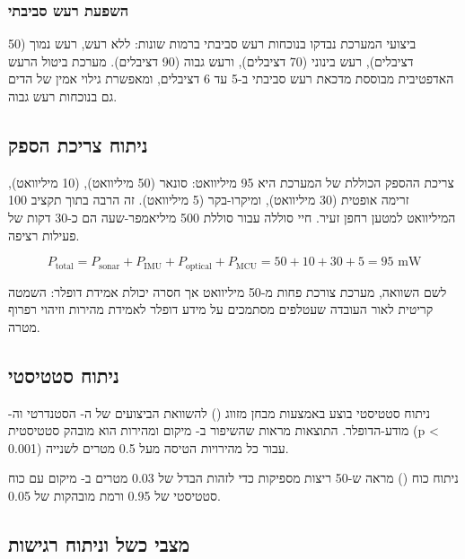 \subsubsection{השפעת רעש סביבתי}
\label{sec:ch08_noise_effect}

ביצועי המערכת נבדקו בנוכחות רעש סביבתי ברמות שונות: ללא רעש, רעש נמוך (50 דציבלים), רעש בינוני (70 דציבלים), ורעש גבוה (90 דציבלים). מערכת ביטול הרעש האדפטיבית מבוססת  מדכאת רעש סביבתי ב-5 עד 6 דציבלים, ומאפשרת גילוי אמין של הדים גם בנוכחות רעש גבוה.

\subsection{ניתוח צריכת הספק}
\label{sec:ch08_power_analysis}

צריכת ההספק הכוללת של המערכת היא 95 מיליוואט: סונאר (50 מיליוואט),  (10 מיליוואט), זרימה אופטית (30 מיליוואט), ומיקרו-בקר (5 מיליוואט). זה הרבה בתוך תקציב 100 המיליוואט למטען רחפן זעיר. חיי סוללה עבור סוללת  500 מיליאמפר-שעה הם כ-30 דקות של פעילות רציפה.

\begin{equation}
P_{\text{total}} = P_{\text{sonar}} + P_{\text{IMU}} + P_{\text{optical}} + P_{\text{MCU}} = 50 + 10 + 30 + 5 = 95 \text{ mW}
\label{eq:ch08_power_total}
\end{equation}

לשם השוואה, מערכת  \cite{Chen2020BioSonar} צורכת פחות מ-50 מיליוואט אך חסרה יכולת אמידת דופלר: השמטה קריטית לאור העובדה שעטלפים מסתמכים על מידע דופלר לאמידת מהירות וזיהוי רפרוף מטרה.

\subsection{ניתוח סטטיסטי}
\label{sec:ch08_statistical_analysis}

ניתוח סטטיסטי בוצע באמצעות מבחן  מזווג () להשוואת הביצועים של ה- הסטנדרטי וה- מודע-הדופלר. התוצאות מראות שהשיפור ב- מיקום ומהירות הוא מובהק סטטיסטית (p < 0.001) עבור כל מהירויות הטיסה מעל 0.5 מטרים לשנייה.

ניתוח כוח () מראה ש-50 ריצות  מספיקות כדי לזהות הבדל של 0.03 מטרים ב- מיקום עם כוח סטטיסטי של 0.95 ורמת מובהקות של 0.05.

\subsection{מצבי כשל וניתוח רגישות}
\label{sec:ch08_failure_modes}

